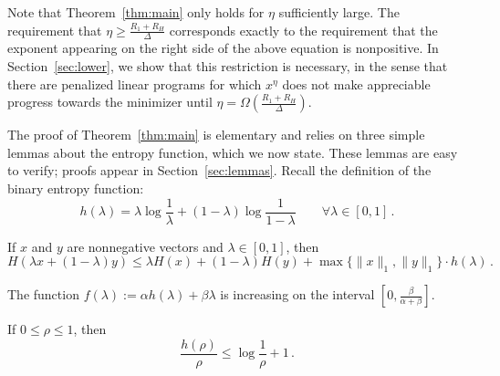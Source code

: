 \documentclass[final,12pt]{colt2018}
\newcommand{\1}{\mathds{1}}
\newcommand*{\ent}[1]{H(#1)}
\begin{document}
Note that Theorem~\ref{thm:main} only holds for $\eta$ sufficiently large.
The requirement that $\eta \geq \frac{R_1 + R_H}{\Delta}$ corresponds exactly to the requirement that the exponent appearing on the right side of the above equation is nonpositive.
In Section~\ref{sec:lower}, we show that this restriction is necessary, in the sense that there are penalized linear programs for which $x^\eta$ does not make appreciable progress towards the minimizer until $\eta = \Omega(\frac{R_1 + R_H}{\Delta})$.


The proof of Theorem~\ref{thm:main} is elementary and relies on three simple lemmas about the entropy function, which we now state.
These lemmas are easy to verify; proofs appear in Section~\ref{sec:lemmas}.
Recall the definition of the binary entropy function:
\begin{equation*}
h(\lambda) = \lambda \log \frac 1 \lambda + (1-\lambda) \log \frac{1}{1-\lambda} \quad \quad \forall \lambda \in [0, 1]\,.
\end{equation*}

\begin{lemma}\label{lem:weak_convexity}
If $x$ and $y$ are nonnegative vectors and $\lambda \in [0, 1]$, then
\begin{equation*}
\ent{\lambda x + (1-\lambda) y} \leq \lambda \ent{x} + (1-\lambda) \ent{y} + \max\{\|x\|_1, \|y\|_1\} \cdot h(\lambda)\,.
\end{equation*}
\end{lemma}

\begin{lemma}\label{lem:monotone}
The function $f(\lambda) := \alpha h(\lambda) + \beta \lambda$ is increasing on the interval $[0, \frac{\beta}{\alpha + \beta}]$.
\end{lemma}

\begin{lemma}\label{lem:binary_entropy_bound}
If $0 \leq \rho \leq 1$, then
\begin{equation*}
\frac{h(\rho)}{\rho} \leq \log \frac 1 \rho + 1\,.
\end{equation*}
\end{lemma}
\end{document}
